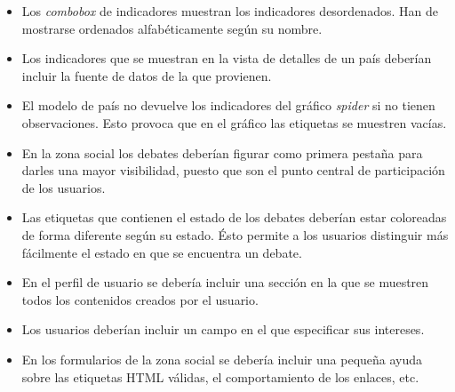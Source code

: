 \begin{itemize}
	\item Los \textit{combobox} de indicadores muestran los indicadores desordenados.  Han de mostrarse ordenados alfabéticamente según su nombre.
	\item Los indicadores que se muestran en la vista de detalles de un país deberían incluir la fuente de datos de la que provienen.
	\item El modelo de país no devuelve los indicadores del gráfico \textit{spider} si no tienen observaciones.  Esto provoca que en el gráfico las etiquetas se muestren vacías.
	\item En la zona social los debates deberían figurar como primera pestaña para darles una mayor visibilidad, puesto que son el punto central de participación de los usuarios.
	\item Las etiquetas que contienen el estado de los debates deberían estar coloreadas de forma diferente según su estado.  Ésto permite a los usuarios distinguir más fácilmente el estado en que se encuentra un debate.
	\item En el perfil de usuario se debería incluir una sección en la que se muestren todos los contenidos creados por el usuario.
	\item Los usuarios deberían incluir un campo en el que especificar sus intereses.
	\item En los formularios de la zona social se debería incluir una pequeña ayuda sobre las etiquetas HTML válidas, el comportamiento de los enlaces, etc.
\end{itemize}
